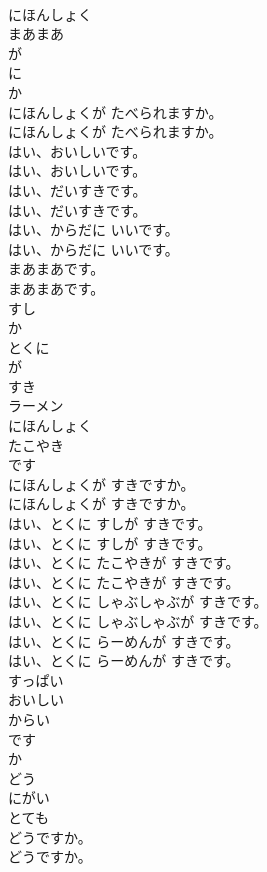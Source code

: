 \documentclass[8pt]{extreport}
\begin{document}
\begin{CJK}{UTF8}{min}
\\	にほんしょく
\\	まあまあ
\\	が
\\	に
\\	か
\\	にほんしょくが たべられますか。	
\\	にほんしょくが たべられますか。 
\\	はい、おいしいです。	
\\	はい、おいしいです。 
\\	はい、だいすきです。	
\\	はい、だいすきです。 
\\	はい、からだに いいです。	
\\	はい、からだに いいです。 
\\	まあまあです。	
\\	まあまあです。 
\\	すし
\\	か
\\	とくに
\\	が
\\	すき
\\	ラーメン
\\	にほんしょく
\\	たこやき
\\	です
\\	にほんしょくが すきですか。	
\\	にほんしょくが すきですか。 
\\	はい、とくに すしが すきです。	
\\	はい、とくに すしが すきです。 
\\	はい、とくに たこやきが すきです。	
\\	はい、とくに たこやきが すきです。 
\\	はい、とくに しゃぶしゃぶが すきです。	
\\	はい、とくに しゃぶしゃぶが すきです。 
\\	はい、とくに らーめんが すきです。	
\\	はい、とくに らーめんが すきです。 
\\	すっぱい
\\	おいしい
\\	からい
\\	です
\\	か
\\	どう
\\	にがい
\\	とても
\\	どうですか。	
\\	どうですか。 

\end{CJK}
\end{document}
